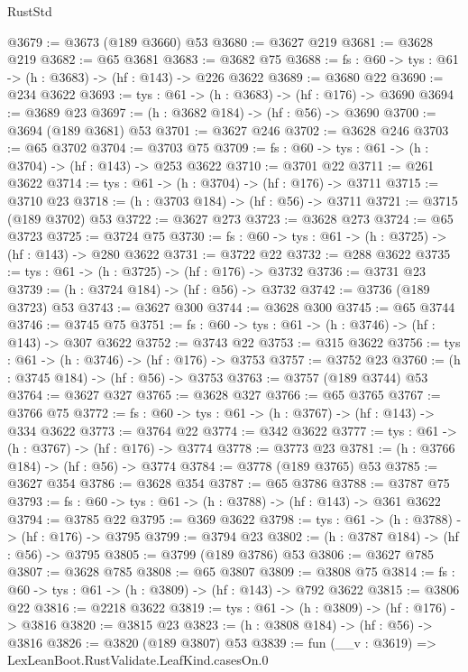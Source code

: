 \begin{lexlean}{RustStd}
\begin{coremodule}
@3679 := @3673 (@189 @3660) @53
@3680 := @3627 @219
@3681 := @3628 @219
@3682 := @65 @3681
@3683 := @3682 @75
@3688 := {fs : @60} -> {tys : @61} -> (h : @3683) -> (hf : @143) -> @226 @3622
@3689 := @3680 @22
@3690 := @234 @3622
@3693 := {tys : @61} -> (h : @3683) -> (hf : @176) -> @3690
@3694 := @3689 @23
@3697 := (h : @3682 @184) -> (hf : @56) -> @3690
@3700 := @3694 (@189 @3681) @53
@3701 := @3627 @246
@3702 := @3628 @246
@3703 := @65 @3702
@3704 := @3703 @75
@3709 := {fs : @60} -> {tys : @61} -> (h : @3704) -> (hf : @143) -> @253 @3622
@3710 := @3701 @22
@3711 := @261 @3622
@3714 := {tys : @61} -> (h : @3704) -> (hf : @176) -> @3711
@3715 := @3710 @23
@3718 := (h : @3703 @184) -> (hf : @56) -> @3711
@3721 := @3715 (@189 @3702) @53
@3722 := @3627 @273
@3723 := @3628 @273
@3724 := @65 @3723
@3725 := @3724 @75
@3730 := {fs : @60} -> {tys : @61} -> (h : @3725) -> (hf : @143) -> @280 @3622
@3731 := @3722 @22
@3732 := @288 @3622
@3735 := {tys : @61} -> (h : @3725) -> (hf : @176) -> @3732
@3736 := @3731 @23
@3739 := (h : @3724 @184) -> (hf : @56) -> @3732
@3742 := @3736 (@189 @3723) @53
@3743 := @3627 @300
@3744 := @3628 @300
@3745 := @65 @3744
@3746 := @3745 @75
@3751 := {fs : @60} -> {tys : @61} -> (h : @3746) -> (hf : @143) -> @307 @3622
@3752 := @3743 @22
@3753 := @315 @3622
@3756 := {tys : @61} -> (h : @3746) -> (hf : @176) -> @3753
@3757 := @3752 @23
@3760 := (h : @3745 @184) -> (hf : @56) -> @3753
@3763 := @3757 (@189 @3744) @53
@3764 := @3627 @327
@3765 := @3628 @327
@3766 := @65 @3765
@3767 := @3766 @75
@3772 := {fs : @60} -> {tys : @61} -> (h : @3767) -> (hf : @143) -> @334 @3622
@3773 := @3764 @22
@3774 := @342 @3622
@3777 := {tys : @61} -> (h : @3767) -> (hf : @176) -> @3774
@3778 := @3773 @23
@3781 := (h : @3766 @184) -> (hf : @56) -> @3774
@3784 := @3778 (@189 @3765) @53
@3785 := @3627 @354
@3786 := @3628 @354
@3787 := @65 @3786
@3788 := @3787 @75
@3793 := {fs : @60} -> {tys : @61} -> (h : @3788) -> (hf : @143) -> @361 @3622
@3794 := @3785 @22
@3795 := @369 @3622
@3798 := {tys : @61} -> (h : @3788) -> (hf : @176) -> @3795
@3799 := @3794 @23
@3802 := (h : @3787 @184) -> (hf : @56) -> @3795
@3805 := @3799 (@189 @3786) @53
@3806 := @3627 @785
@3807 := @3628 @785
@3808 := @65 @3807
@3809 := @3808 @75
@3814 := {fs : @60} -> {tys : @61} -> (h : @3809) -> (hf : @143) -> @792 @3622
@3815 := @3806 @22
@3816 := @2218 @3622
@3819 := {tys : @61} -> (h : @3809) -> (hf : @176) -> @3816
@3820 := @3815 @23
@3823 := (h : @3808 @184) -> (hf : @56) -> @3816
@3826 := @3820 (@189 @3807) @53
@3839 := fun (__v : @3619) =>
  LexLeanBoot.RustValidate.LeafKind.casesOn.{0}

\end{coremodule}
\end{lexlean}
